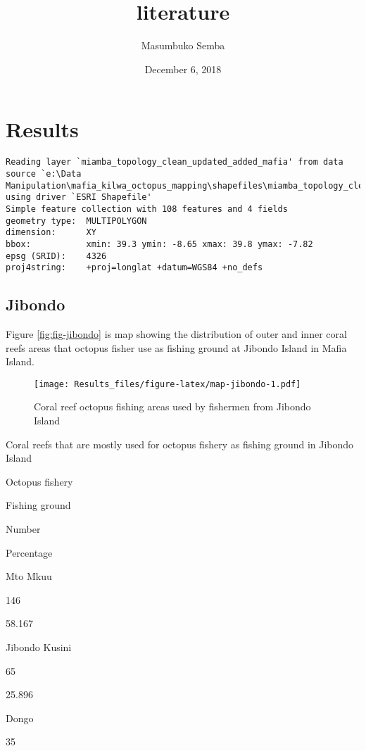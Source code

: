 \documentclass[]{article}
\title{literature}
\author{Masumbuko Semba}
\date{December 6, 2018}
\begin{document}
\maketitle

{
\setcounter{tocdepth}{2}
\tableofcontents
}
\section{Results}\label{results}

\begin{verbatim}
Reading layer `miamba_topology_clean_updated_added_mafia' from data source `e:\Data Manipulation\mafia_kilwa_octopus_mapping\shapefiles\miamba_topology_clean_updated_added_mafia.shp' using driver `ESRI Shapefile'
Simple feature collection with 108 features and 4 fields
geometry type:  MULTIPOLYGON
dimension:      XY
bbox:           xmin: 39.3 ymin: -8.65 xmax: 39.8 ymax: -7.82
epsg (SRID):    4326
proj4string:    +proj=longlat +datum=WGS84 +no_defs
\end{verbatim}

\subsection{Jibondo}\label{jibondo}

Figure \ref{fig:fig-jibondo} is map showing the distribution of outer
and inner coral reefs areas that octopus fisher use as fishing ground at
Jibondo Island in Mafia Island.

\begin{figure}
\centering
\texttt{[image: Results\_files/figure-latex/map-jibondo-1.pdf]}
\caption{\label{fig:map-jibondo}Coral reef octopus fishing areas used by
fishermen from Jibondo Island}
\end{figure}

\label{tab:tab11}Coral reefs that are mostly used for octopus fishery as
fishing ground in Jibondo Island

Octopus fishery

Fishing ground

Number

Percentage

Mto Mkuu

146

58.167

Jibondo Kusini

65

25.896

Dongo

35
\end{document}
